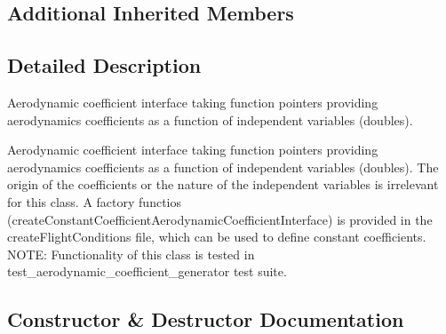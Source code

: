 \subsection*{Additional Inherited Members}


\subsection{Detailed Description}
Aerodynamic coefficient interface taking function pointers providing aerodynamics coefficients as a function of independent variables (doubles).

Aerodynamic coefficient interface taking function pointers providing aerodynamics coefficients as a function of independent variables (doubles). The origin of the coefficients or the nature of the independent variables is irrelevant for this class. A factory functios (create\+Constant\+Coefficient\+Aerodynamic\+Coefficient\+Interface) is provided in the create\+Flight\+Conditions file, which can be used to define constant coefficients. N\+O\+TE\+: Functionality of this class is tested in test\+\_\+aerodynamic\+\_\+coefficient\+\_\+generator test suite. 

\subsection{Constructor \& Destructor Documentation}
